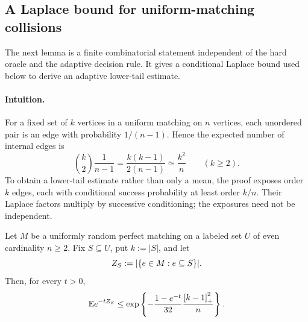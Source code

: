 \subsection{A Laplace bound for uniform-matching collisions}
\label{app:lower-proof-matching-laplace}

The next lemma is a finite combinatorial statement independent of the hard
oracle and the adaptive decision rule. It gives a conditional
Laplace bound used below to derive an adaptive lower-tail estimate.

\paragraph{Intuition.}
For a fixed set of $k$ vertices in a uniform matching on $n$ vertices,
each unordered pair is an edge with probability $1/(n-1)$.  Hence the
expected number of internal edges is
\[
 \binom{k}{2}\frac1{n-1}
 =\frac{k(k-1)}{2(n-1)}
 \simeq\frac{k^2}{n}\qquad(k\ge2).
\]
To obtain a lower-tail estimate rather than only a mean, the proof exposes
order $k$ edges, each with conditional success probability at least order
$k/n$.  Their Laplace factors multiply by successive conditioning; the
exposures need not be independent.

\begin{lemma}
\label{app:lem:matching-collision-laplace}
Let \(M\) be a uniformly random perfect matching on a labeled set \(U\) of
even cardinality \(n\ge 2\). Fix \(S\subseteq U\), put \(k:=|S|\), and let
\[
 Z_{S}:=|\{e\in M:e\subseteq S\}|.
\]
Then, for every \(t>0\),
\begin{equation}
 \mathbb E e^{-tZ_{S}}
 \le
 \exp\left\{
  -\frac{1-e^{-t}}{32}\frac{\left[k-1\right]_+^2}{n}
 \right\}.
 \label{app:eq:matching-collision-laplace}
\end{equation}
\end{lemma}


